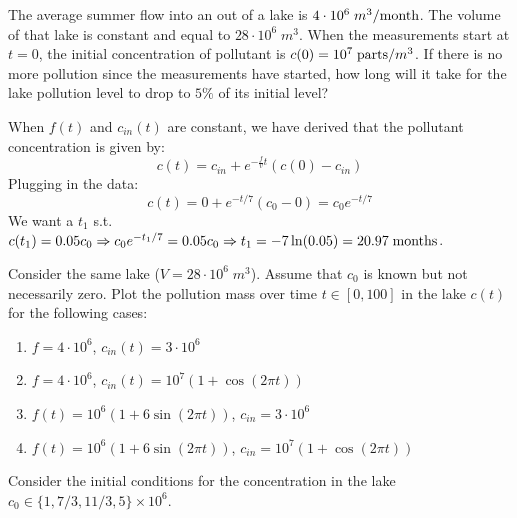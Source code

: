 \documentclass[a4paper]{article}
\begin{document}
\begin{exmp}
The average summer flow into an out of a lake is $4\cdot 10^6\; m^3/\textup{month}$. The volume of that lake is constant and equal to $28\cdot 10^6 \; m^3$. When the measurements start at $t=0$, the initial concentration of pollutant is $c(0) = 10^7 \; \textup{parts}/m^3$. If there is no more pollution since the measurements have started, how long will it take for the lake pollution level to drop to $5\%$ of its initial level?
\end{exmp}
\begin{soln}
When $f(t)$ and $c_{in}(t)$ are constant, we have derived that the pollutant concentration is given by:
 \[
    c(t) = c_{in} + e^{-\frac{f}{v}t} (c(0) - c_{in})
\]
Plugging in the data:
\[
    c(t) = 0 + e^{-t/7} (c_0 - 0) = c_0e^{-t/7}
\]
We want a $t_1$ s.t. $c(t_1) = 0.05c_0 \Rightarrow  c_0e^{-t_1/7} = 0.05c_0 \Rightarrow t_1 = -7\ln(0.05) = 20.97 \; \textup{months}$.
\end{soln}

\begin{exmp}
Consider the same lake ($V = 28\cdot 10^6\; m^3$). Assume that $c_0$ is known but not necessarily zero. Plot the pollution mass over time $t\in [0,100]$ in the lake $c(t)$ for the following cases:
\begin{enumerate}
    \item $f = 4\cdot 10^6$, $c_{in}(t) =3\cdot 10^6$
    \item $f = 4\cdot 10^6$, $c_{in}(t) = 10^7(1+\cos(2\pi t))$
    \item $f(t) = 10^6(1+6\sin(2\pi t))$, $c_{in} = 3\cdot 10^6$
    \item $f(t) = 10^6(1+6\sin(2\pi t))$, $c_{in} = 10^7(1+\cos(2\pi t))$
\end{enumerate}
Consider the initial conditions for the concentration in the lake $c_0 \in \{1,7/3,11/3,5\}\times 10^6$.
\end{exmp}
\end{document}
